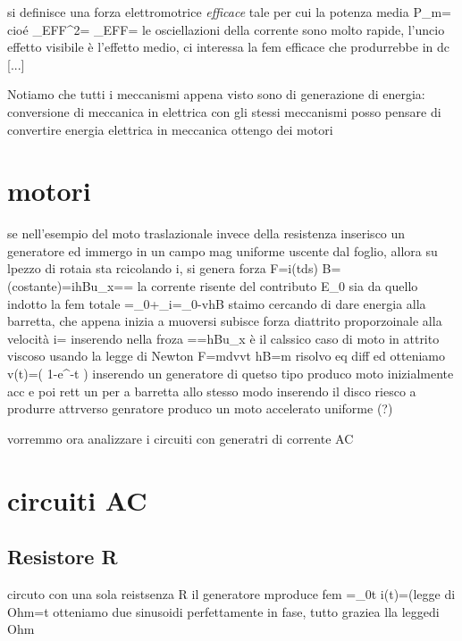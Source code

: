 {{si definisce una forza elettromotrice \textit{efficace} tale per cui la potenza media
P_m=
cioé _{EFF}^2=
_{EFF}=
le osciellazioni della corrente sono molto rapide, l'uncio effetto visibile è l'effetto medio, ci interessa la fem efficace che produrrebbe in dc [...]

Notiamo che tutti i meccanismi appena visto sono di generazione di energia: conversione di meccanica in elettrica
con gli stessi meccanismi posso pensare di convertire energia elettrica in meccanica
ottengo dei motori
\section{motori}
se nell'esempio del moto traslazionale invece della resistenza inserisco un generatore ed immergo in un campo mag uniforme uscente dal foglio, allora su lpezzo di rotaia sta rcicolando i, si genera forza
\vba F=i\left(\in td\vba s\right) \cross\vba B=(costante)=ihB\vbh u_x==
la corrente risente del contributo E_0 sia da quello indotto
la fem totale =_0+_i=_0-vhB
staimo cercando di dare energia alla barretta, che appena inizia a muoversi subisce forza diattrito proporzoinale alla velocità
i=
inserendo nella froza
==hB\vbh u_x
è il calssico caso di moto in attrito viscoso
usando la legge di Newton F=mdv{v}{t}
hB=m
risolvo eq diff ed otteniamo
v(t)=\left( 1-e^{-t} \right)
inserendo un generatore di quetso tipo produco moto inizialmente acc e poi rett un per a barretta
allo stesso modo inserendo il disco riesco a produrre attrverso genratore produco un moto accelerato uniforme (?)


vorremmo ora analizzare i circuiti con generatri di corrente AC 

\section{circuiti AC}
\subsection{Resistore R}
circuto con una sola reistsenza R
il generatore mproduce fem =_0\cos\omega t
i(t)=(legge di Ohm=\cos\omega t
otteniamo due sinusoidi perfettamente in fase, tutto graziea lla leggedi Ohm

}}
